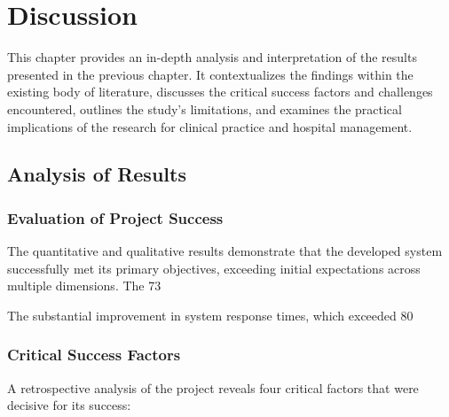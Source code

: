 \chapter{Discussion}

This chapter provides an in-depth analysis and interpretation of the results presented in the previous chapter. It contextualizes the findings within the existing body of literature, discusses the critical success factors and challenges encountered, outlines the study's limitations, and examines the practical implications of the research for clinical practice and hospital management.

\section{Analysis of Results}

\subsection{Evaluation of Project Success}

The quantitative and qualitative results demonstrate that the developed system successfully met its primary objectives, exceeding initial expectations across multiple dimensions. The 73%

The substantial improvement in system response times, which exceeded 80%

\subsection{Critical Success Factors}

A retrospective analysis of the project reveals four critical factors that were decisive for its success:

